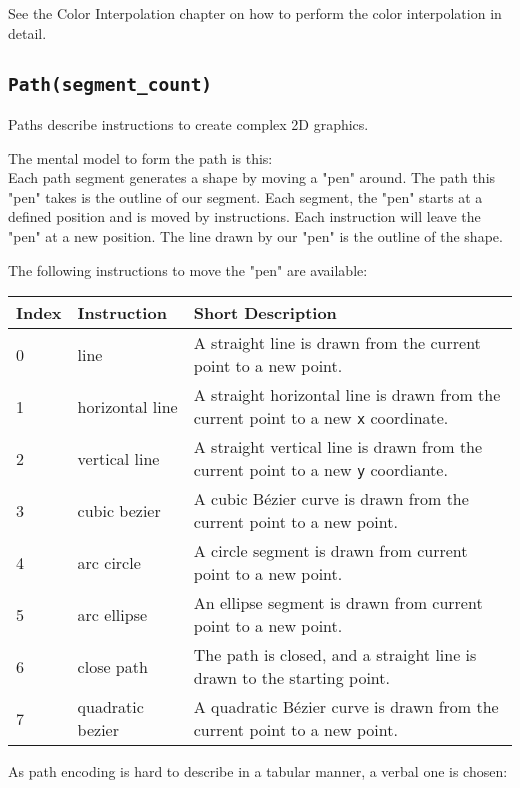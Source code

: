 \documentclass[]{article}
\begin{document}
See the \hypertarget{color-interpolation}{Color Interpolation} chapter on how to perform the color interpolation in detail.

\hypertarget{pathsegment_count}{\subsection{\texorpdfstring{\texttt{Path(segment\_count)}}{Path(segment\_count)}}\label{pathsegment_count}}

Paths describe instructions to create complex 2D graphics.

The mental model to form the path is this:\\
Each path segment generates a shape by moving a "pen" around. The path
this "pen" takes is the outline of our segment. Each segment, the "pen"
starts at a defined position and is moved by instructions. Each
instruction will leave the "pen" at a new position. The line drawn by
our "pen" is the outline of the shape.

The following instructions to move the "pen" are available:

\begin{longtable}[]{@{}p{0.5in}p{1.0in}p{4.5in}@{}}
\toprule
Index & Instruction & Short Description \\
\midrule
\endhead
0 & line             & A straight line is drawn from the current point to a new point. \\
1 & horizontal line  & A straight horizontal line is drawn from the current point to a new \texttt{x} coordinate. \\
2 & vertical line    & A straight vertical line is drawn from the current point to a new \texttt{y} coordiante. \\
3 & cubic bezier     & A cubic Bézier curve is drawn from the current point to a new point. \\
4 & arc circle       & A circle segment is drawn from current point to a new point. \\
5 & arc ellipse      & An ellipse segment is drawn from current point to a new point. \\
6 & close path       & The path is closed, and a straight line is drawn to the starting point. \\
7 & quadratic bezier & A quadratic Bézier curve is drawn from the current point to a new point. \\
\bottomrule
\end{longtable}

As path encoding is hard to describe in a tabular manner, a verbal one
is chosen:
\end{document}
